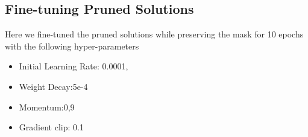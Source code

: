 \subsection{Fine-tuning Pruned Solutions}
\label{subsec:Fine_tuning_solutions}
Here we fine-tuned the pruned solutions while preserving the mask for 10 epochs with the following hyper-parameters
\begin{itemize}
  \item Initial Learning Rate: 0.0001,
  \item Weight Decay:5e-4
  \item Momentum:0,9
  \item Gradient clip: 0.1
\end{itemize}

